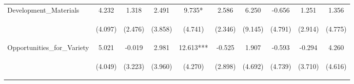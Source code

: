 \begin{tabular}{lccccccccc}
\noalign{\smallskip}Development_Materials & 4.232 & 1.318 & 2.491 & 9.735* & 2.586 & 6.250 & -0.656 & 1.251 & 1.356\\
 & \begin{footnotesize}(4.097)\end{footnotesize} & \begin{footnotesize}(2.476)\end{footnotesize} & \begin{footnotesize}(3.858)\end{footnotesize} & \begin{footnotesize}(4.741)\end{footnotesize} & \begin{footnotesize}(2.346)\end{footnotesize} & \begin{footnotesize}(9.145)\end{footnotesize} & \begin{footnotesize}(4.791)\end{footnotesize} & \begin{footnotesize}(2.914)\end{footnotesize} & \begin{footnotesize}(4.775)\end{footnotesize}\\
\noalign{\smallskip}Opportunities_for_Variety & 5.021 & -0.019 & 2.981 & 12.613*** & -0.525 & 1.907 & -0.593 & -0.294 & 4.260\\
 & \begin{footnotesize}(4.049)\end{footnotesize} & \begin{footnotesize}(3.223)\end{footnotesize} & \begin{footnotesize}(3.960)\end{footnotesize} & \begin{footnotesize}(4.270)\end{footnotesize} & \begin{footnotesize}(2.898)\end{footnotesize} & \begin{footnotesize}(4.692)\end{footnotesize} & \begin{footnotesize}(4.739)\end{footnotesize} & \begin{footnotesize}(3.710)\end{footnotesize} & \begin{footnotesize}(4.616)\end{footnotesize}\\

\end{tabular}
